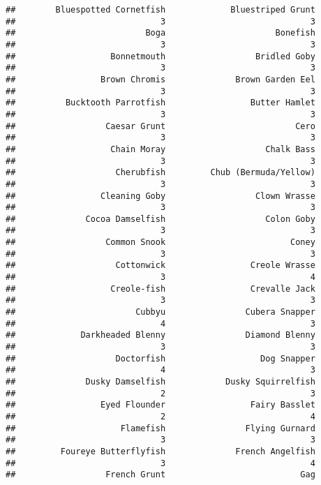 \documentclass[
]{article}
\begin{document}
\begin{verbatim}
##        Bluespotted Cornetfish             Bluestriped Grunt 
##                             3                             3 
##                          Boga                      Bonefish 
##                             3                             3 
##                   Bonnetmouth                  Bridled Goby 
##                             3                             3 
##                 Brown Chromis              Brown Garden Eel 
##                             3                             3 
##          Bucktooth Parrotfish                 Butter Hamlet 
##                             3                             3 
##                  Caesar Grunt                          Cero 
##                             3                             3 
##                   Chain Moray                    Chalk Bass 
##                             3                             3 
##                    Cherubfish         Chub (Bermuda/Yellow) 
##                             3                             3 
##                 Cleaning Goby                  Clown Wrasse 
##                             3                             3 
##              Cocoa Damselfish                    Colon Goby 
##                             3                             3 
##                  Common Snook                         Coney 
##                             3                             3 
##                    Cottonwick                 Creole Wrasse 
##                             3                             4 
##                   Creole-fish                 Crevalle Jack 
##                             3                             3 
##                        Cubbyu                Cubera Snapper 
##                             4                             3 
##             Darkheaded Blenny                Diamond Blenny 
##                             3                             3 
##                    Doctorfish                   Dog Snapper 
##                             4                             3 
##              Dusky Damselfish            Dusky Squirrelfish 
##                             2                             3 
##                 Eyed Flounder                 Fairy Basslet 
##                             2                             4 
##                     Flamefish                Flying Gurnard 
##                             3                             3 
##         Foureye Butterflyfish              French Angelfish 
##                             3                             4 
##                  French Grunt                           Gag 

\end{verbatim}
\end{document}
